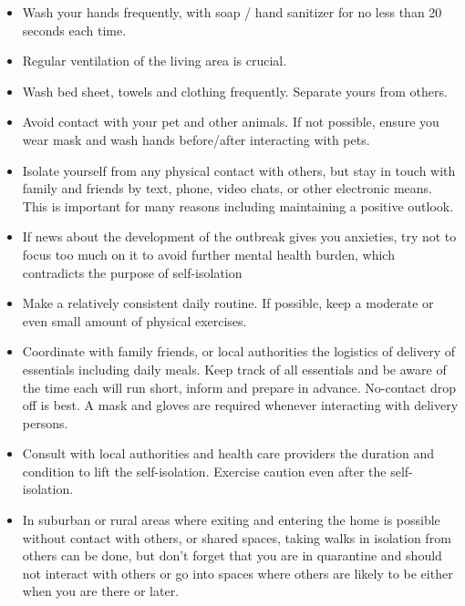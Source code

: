 \documentclass[onecolumn,journal]{IEEEtran}
\begin{document}
\begin{multicols}{2}
\begin{itemize}
\item Wash your hands frequently, with soap / hand sanitizer for no less than 20 seconds each time.

\item Regular ventilation of the living area is crucial. 

\item Wash bed sheet, towels and clothing frequently. Separate yours from others.

\item Avoid contact with your pet and other animals. If not possible, ensure you wear mask and wash hands before/after interacting with pets.

\item Isolate yourself from any physical contact with others, but stay in touch with family and friends by text, phone, video chats, or other electronic means. This is important for many reasons including maintaining a positive outlook. 

\item If news about the development of the outbreak gives you anxieties, try not to focus too much on it to avoid further mental health burden, which contradicts the purpose of self-isolation

\item Make a relatively consistent daily routine. If possible, keep a moderate or even small amount of physical exercises. 

\item Coordinate with family friends, or local authorities the logistics of delivery of essentials including daily meals. Keep track of all essentials and be aware of the time each will run short, inform and prepare in advance. No-contact drop off is best. A mask and gloves are required whenever interacting with delivery persons. 

\item Consult with local authorities and health care providers the duration and condition to lift the self-isolation. Exercise caution even after the self-isolation.

\item In suburban or rural areas where exiting and entering the home is possible without contact with others, or shared spaces, taking walks in isolation from others can be done, but don't forget that you are in quarantine and should not interact with others or go into spaces where others are likely to be either when you are there or later. 

\end{itemize}


\end{multicols}
\end{document}
